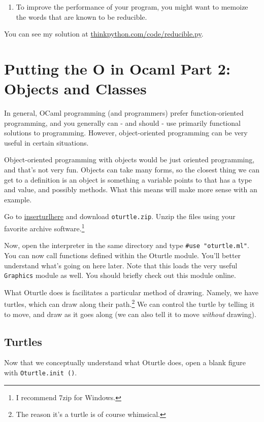 \documentclass[10pt]{book}
\begin{document}
{\begin{ex}
\begin{enumerate}
\item To improve the performance of your program, you might want
to memoize the words that are known to be reducible.

\end{enumerate}

You can see my solution at \url{thinkpython.com/code/reducible.py}.

\end{ex}


\chapter{Putting the O in Ocaml Part 2: Objects and Classes}

In general, OCaml programming (and programmers) prefer function-oriented programming, and you generally can - and should - use primarily functional solutions to programming. However, object-oriented programming can be very useful in certain situations.

Object-oriented programming with objects would be just oriented programming, and that's not very fun. Objects can take many forms, so the closest thing we can get to a definition is an object is something a variable points to that has a type and value, and possibly methods. What this means will make more sense with an example.

Go to \url{inserturlhere} and download {\tt oturtle.zip}. Unzip the files using your favorite archive software.\footnote{I recommend 7zip for Windows.}

Now, open the interpreter in the same directory and type {\tt \#use "oturtle.ml"}. You can now call functions defined within the Oturtle module. You'll better understand  what's going on here later. Note that this loads the very useful {\tt Graphics} module as well. You should briefly check out this module online.

What Oturtle does is facilitates a particular method of drawing. Namely, we have turtles, which can draw along their path.\footnote{The reason it's a turtle is of course whimsical.} We can control the turtle by telling it to move, and draw as it goes along (we can also tell it to move {\it without} drawing).

\section{Turtles}

Now that we conceptually understand what Oturtle does, open a blank figure with {\tt Oturtle.init ()}.

}
\end{document}
